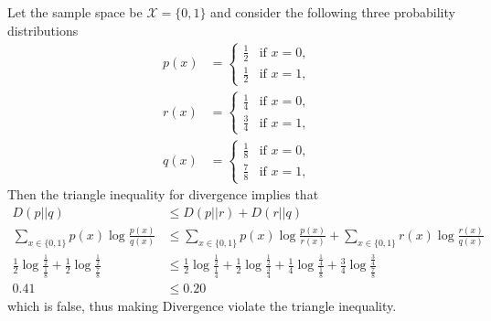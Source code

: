 \documentclass[
  coursecode={MTHE 474},
  assignmentname={Homework \homeworknumber},
  studentnumber=20053722,
  name={Bryan Hoang},
  draft,
]{
  ltxanswer%
}
\begin{document}
  \begin{questions}
    \setcounter{question}{\questionnumber}
    \addtocounter{question}{-1}
    \question[10]\
    \begin{parts}
      \part{}
      \begin{solution}
        \begin{example}
          Let the sample space be \(\mathcal{X}=\{0,1\}\) and consider the following three probability distributions
          \begin{align*}
            p(x) &= \begin{cases}
                      \frac{1}{2} &\text{if } x=0, \\
                      \frac{1}{2} &\text{if } x=1,
                    \end{cases} \\
            r(x) &= \begin{cases}
                      \frac{1}{4} &\text{if } x=0, \\
                      \frac{3}{4} &\text{if } x=1,
                    \end{cases} \\
            q(x) &= \begin{cases}
                      \frac{1}{8} &\text{if } x=0, \\
                      \frac{7}{8} &\text{if } x=1,
                    \end{cases}
          \end{align*}
          Then the triangle inequality for divergence implies that
          \begin{align*}
            D(p||q)                                                                                           &\le D(p||r) + D(r||q)                                                                                                                                                                                     \\
            \sum_{x\in\{0,1\}} p(x)\log\frac{p(x)}{q(x)}                                                      &\le \sum_{x\in\{0,1\}} p(x)\log\frac{p(x)}{r(x)} + \sum_{x\in\{0,1\}} r(x)\log\frac{r(x)}{q(x)}                                                                                                           \\
            \frac{1}{2} \log\frac{\frac{1}{2}}{\frac{1}{8}} + \frac{1}{2} \log\frac{\frac{1}{2}}{\frac{7}{8}} &\le \frac{1}{2} \log\frac{\frac{1}{2}}{\frac{1}{4}} + \frac{1}{2} \log\frac{\frac{1}{2}}{\frac{3}{4}} + \frac{1}{4} \log\frac{\frac{1}{4}}{\frac{1}{8}} + \frac{3}{4} \log\frac{\frac{3}{4}}{\frac{7}{8}} \\
            0.41                                                                                              &\le 0.20
          \end{align*}
          which is false, thus making Divergence violate the triangle inequality.
        \end{example}
      \end{solution}


\end{parts}
\end{questions}
\end{document}
